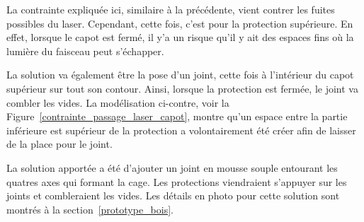 \begin{minipage}[c]{0.6\textwidth}
    La contrainte expliquée ici, similaire à la précédente, vient contrer les fuites possibles du laser. Cependant, cette fois, c'est pour la protection supérieure. En effet, lorsque le capot est fermé, il y'a un risque qu'il y ait des espaces fins où la lumière du faisceau peut s'échapper.

    La solution va également être la pose d'un joint, cette fois à l'intérieur du capot supérieur sur tout son contour. Ainsi, lorsque la protection est fermée, le joint va combler les vides. La modélisation ci-contre, voir la Figure~\ref{contrainte_passage_laser_capot}, montre qu'un espace entre la partie inférieure est supérieur de la protection a volontairement été créer afin de laisser de la place pour le joint.

    La solution apportée a été d'ajouter un joint en mousse souple entourant les quatres axes qui formant la cage. Les protections viendraient s'appuyer sur les joints et combleraient les vides. Les détails en photo pour cette solution sont montrés à la section~\ref{prototype_bois}.
\end{minipage}\hfill

